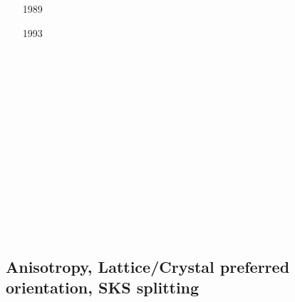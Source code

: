 \begin{scriptsize}
\begin{itemize}
\item[1989]
\textcite{brbe89b} \\
\item[1993]
\textcite{gowo93} \\
\item[\twothousandthree]
\textcite{hube03} \\
\item[\twothousandsix]
\textcite{coma06} \\
\item[\twothousandeight]
\textcite{vanv08} \\
\textcite{naht08} \\
\item[\twothousandeleven]
\textcite{vanj11} \\
\item[\twothousandfourteen]
\textcite{buge14} \\
\textcite{flgw14} \\
\item[\twothousandfifteen]
\textcite{svlh15} \\
\item[\twothousandsixteen]
\textcite{frsc16} \\
\end{itemize}
\end{scriptsize}


\subsection{Anisotropy, Lattice/Crystal preferred orientation, SKS splitting}
\label{sec:topics:anisotropy}

